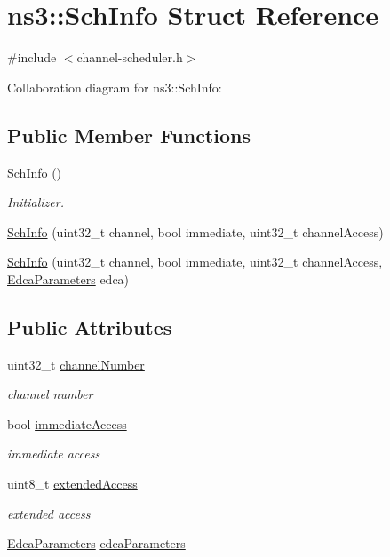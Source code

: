 \hypertarget{structns3_1_1SchInfo}{}\section{ns3\+:\+:Sch\+Info Struct Reference}
\label{structns3_1_1SchInfo}


{\ttfamily \#include $<$channel-\/scheduler.\+h$>$}



Collaboration diagram for ns3\+:\+:Sch\+Info\+:
\subsection*{Public Member Functions}
\begin{DoxyCompactItemize}
\item 
\hyperlink{structns3_1_1SchInfo_a126a208cfa3aef611197e002723f7cfb}{Sch\+Info} ()
\begin{DoxyCompactList}\small\item\em Initializer. \end{DoxyCompactList}\item 
\hyperlink{structns3_1_1SchInfo_a9fbb5b5e1f27a991fafa72d9a4f8b684}{Sch\+Info} (uint32\+\_\+t channel, bool immediate, uint32\+\_\+t channel\+Access)
\item 
\hyperlink{structns3_1_1SchInfo_ac3fb2ec1bf15cb91ed6b8d6cb7574fce}{Sch\+Info} (uint32\+\_\+t channel, bool immediate, uint32\+\_\+t channel\+Access, \hyperlink{namespacens3_a4f9cc7033fc74229d642a5add53ad8e2}{Edca\+Parameters} edca)
\end{DoxyCompactItemize}
\subsection*{Public Attributes}
\begin{DoxyCompactItemize}
\item 
uint32\+\_\+t \hyperlink{structns3_1_1SchInfo_a86682f3770c4d6cc7b750b135c544983}{channel\+Number}
\begin{DoxyCompactList}\small\item\em channel number \end{DoxyCompactList}\item 
bool \hyperlink{structns3_1_1SchInfo_ab81e6423eb00fabcd0e9bad1e9501f31}{immediate\+Access}
\begin{DoxyCompactList}\small\item\em immediate access \end{DoxyCompactList}\item 
uint8\+\_\+t \hyperlink{structns3_1_1SchInfo_a4c819d5734d4a62f58fce9a701e6288a}{extended\+Access}
\begin{DoxyCompactList}\small\item\em extended access \end{DoxyCompactList}\item 
\hyperlink{namespacens3_a4f9cc7033fc74229d642a5add53ad8e2}{Edca\+Parameters} \hyperlink{structns3_1_1SchInfo_a79df358208767350348f61063e4c3303}{edca\+Parameters}
\end{DoxyCompactItemize}



